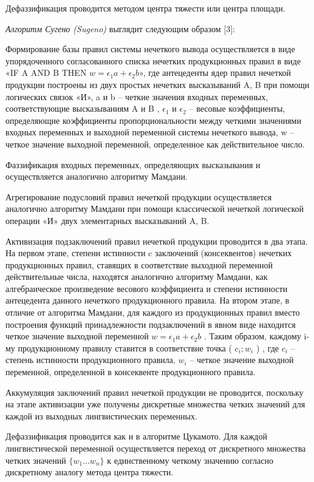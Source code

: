 Дефаззификация проводится методом центра тяжести или центра площади.

\textit{Алгоритм Сугено (Sugeno)} выглядит следующим образом [3]:

Формирование базы правил системы нечеткого вывода осуществляется в виде упорядоченного согласованного списка нечетких продукционных правил в виде «IF A AND B THEN $w=\epsilon_1 a + \epsilon_2 b $», где антецеденты ядер правил нечеткой продукции построены из двух простых нечетких высказываний A, B при помощи логических связок «И», a и b – четкие значения входных переменных, соответствующие высказываниям A и B , $\epsilon_1$ и $\epsilon_2$ – весовые коэффициенты, определяющие коэффициенты пропорциональности между четкими значениями входных переменных и выходной переменной системы нечеткого вывода, w – четкое значение выходной переменной, определенное как действительное число.

Фаззификация входных переменных, определяющих высказывания и осуществляется аналогично алгоритму Мамдани.

Агрегирование подусловий правил нечеткой продукции осуществляется аналогично алгоритму Мамдани при помощи классической нечеткой логической операции «И» двух элементарных высказываний A, B.

Активизация подзаключений правил нечеткой продукции проводится в два этапа. На первом этапе, степени истинности c заключений (консеквентов) нечетких продукционных правил, ставящих в соответствие выходной переменной действительные числа, находятся аналогично алгоритму Мамдани, как алгебраическое произведение весового коэффициента и степени истинности антецедента данного нечеткого продукционного правила. На втором этапе, в отличие от алгоритма Мамдани, для каждого из продукционных правил вместо построения функций принадлежности подзаключений в явном виде находится четкое значение выходной переменной $w= \epsilon_1 a+ \epsilon_2 b$ . Таким образом, каждому i-му продукционному правилу ставится в соответствие точка ( $c_i; w_i$ ) , где $c_i$ – степень истинности продукционного правила, $w_i$ – четкое значение выходной переменной, определенной в консеквенте продукционного правила.

Аккумуляция заключений правил нечеткой продукции не проводится, поскольку на этапе активизации уже получены дискретные множества четких значений для каждой из выходных лингвистических переменных.

Дефаззификация проводится как и в алгоритме Цукамото. Для каждой лингвистической переменной осуществляется переход от дискретного множества четких значений $\{w_1...w_n\}$ к единственному четкому значению согласно дискретному аналогу метода центра тяжести.


